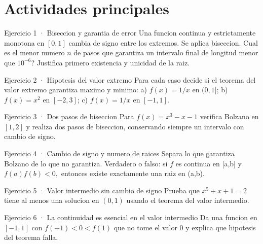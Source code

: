 \documentclass[10pt,a4paper,oneside,openany]{book}
\begin{document}
\section*{Actividades principales}
\begin{PSevenExerciseFixed}{Ejercicio 1 · Biseccion y garantia de error}
Una funcion continua y estrictamente monotona en \([0,1]\) cambia de signo entre los extremos. Se aplica biseccion. Cual es el menor numero \(n\) de pasos que garantiza un intervalo final de longitud menor que \(10^{-6}\)? Justifica primero existencia y unicidad de la raiz.
\end{PSevenExerciseFixed}
\begin{PSevenExerciseFixed}{Ejercicio 2 · Hipotesis del valor extremo}
Para cada caso decide si el teorema del valor extremo garantiza maximo y minimo: a) \(f(x)=1/x\) en \((0,1]\); b) \(f(x)=x^{2}\) en \([-2,3]\); c) \(f(x)=1/x\) en \([-1,1]\).
\end{PSevenExerciseFixed}
\begin{PSevenExerciseFixed}{Ejercicio 3 · Dos pasos de biseccion}
Para \(f(x)=x^{3}-x-1\) verifica Bolzano en \([1,2]\) y realiza dos pasos de biseccion, conservando siempre un intervalo con cambio de signo.
\end{PSevenExerciseFixed}
\begin{PSevenExerciseFixed}{Ejercicio 4 · Cambio de signo y numero de raices}
Separa lo que garantiza Bolzano de lo que no garantiza. Verdadero o falso: si \(f\) es continua en [a,b] y \(f(a)f(b)<0,\) entonces existe exactamente una raiz en (a,b).
\end{PSevenExerciseFixed}
\begin{PSevenExerciseFixed}{Ejercicio 5 · Valor intermedio sin cambio de signo}
Prueba que \(x^{5}+x+1=2\) tiene al menos una solucion en \((0,1)\) usando el teorema del valor intermedio.
\end{PSevenExerciseFixed}
\begin{PSevenExerciseFixed}{Ejercicio 6 · La continuidad es esencial en el valor intermedio}
Da una funcion en \([-1,1]\) con \(f(-1)<0<f(1)\) que no tome el valor \(0\) y explica que hipotesis del teorema falla.
\end{PSevenExerciseFixed}
\end{document}
